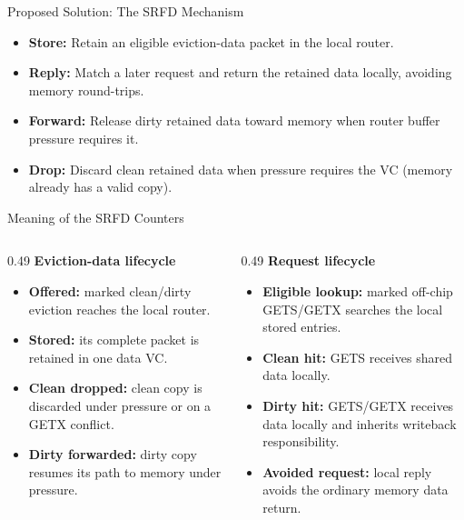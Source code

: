 \documentclass[aspectratio=169,11pt]{beamer}
\begin{document}
\begin{frame}{Proposed Solution: The SRFD Mechanism}
  \begin{itemize}
    \item \textbf{Store:} Retain an eligible eviction-data packet in the local router.
    \item \textbf{Reply:} Match a later request and return the retained data locally, avoiding memory round-trips.
    \item \textbf{Forward:} Release dirty retained data toward memory when router buffer pressure requires it.
    \item \textbf{Drop:} Discard clean retained data when pressure requires the VC (memory already has a valid copy).
  \end{itemize}
\end{frame}

\begin{frame}{Meaning of the SRFD Counters}
  \footnotesize
  \begin{columns}[T]
    \begin{column}{0.49\textwidth}
      \textbf{Eviction-data lifecycle}
      \begin{itemize}
        \item \textbf{Offered:} marked clean/dirty eviction reaches the local router.
        \item \textbf{Stored:} its complete packet is retained in one data VC.
        \item \textbf{Clean dropped:} clean copy is discarded under pressure or on a GETX conflict.
        \item \textbf{Dirty forwarded:} dirty copy resumes its path to memory under pressure.
      \end{itemize}
    \end{column}
    \begin{column}{0.49\textwidth}
      \textbf{Request lifecycle}
      \begin{itemize}
        \item \textbf{Eligible lookup:} marked off-chip GETS/GETX searches the local stored entries.
        \item \textbf{Clean hit:} GETS receives shared data locally.
        \item \textbf{Dirty hit:} GETS/GETX receives data locally and inherits writeback responsibility.
        \item \textbf{Avoided request:} local reply avoids the ordinary memory data return.
      \end{itemize}
    \end{column}
  \end{columns}
  \vspace{0.1cm}
  \centering
\end{frame}
\end{document}
